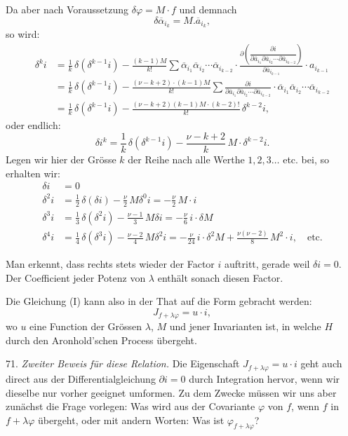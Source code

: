 \documentclass[11pt]{article}
\providecommand{\weberpage}[1]{}
\providecommand{\weq}[2]{\begin{equation}\tag{#1}#2\end{equation}}
\begin{document}
Da aber nach Voraussetzung $\delta\varphi = M\cdot f$ und demnach
\[
\delta\overline\alpha_{i_k} = M.\overline a_{i_k},
\]
so wird:
\[
\begin{aligned}
\delta^k i &= \frac{1}{k}\,\delta(\delta^{k-1}i) - \frac{(k-1)M}{k!}\sum \overline\alpha_{i_1}\overline\alpha_{i_2}\cdots\overline\alpha_{i_{k-2}}\cdot \frac{\partial\left(\dfrac{\partial i}{\partial\overline a_{i_1}\partial\overline a_{i_2}\cdots\partial\overline a_{i_{k-2}}}\right)}{\partial\overline a_{i_{k-1}}}\cdot a_{i_{k-1}}\\
&= \frac{1}{k}\,\delta(\delta^{k-1}i) - \frac{(\nu-k+2)\cdot(k-1)M}{k!}\sum \frac{\partial i}{\partial\overline a_{i_1}\partial\overline a_{i_2}\cdots\partial\overline a_{i_{k-2}}}\cdot \overline\alpha_{i_1}\overline\alpha_{i_2}\cdots\overline\alpha_{i_{k-2}}\\
&= \frac{1}{k}\,\delta(\delta^{k-1}i) - \frac{(\nu-k+2)(k-1)M\cdot(k-2)!}{k!}\,\delta^{k-2}i,
\end{aligned}
\]
oder endlich:
\weq{II}{\delta i^k = \frac{1}{k}\,\delta(\delta^{k-1}i) - \frac{\nu-k+2}{k}\,M\cdot\delta^{k-2}i.}
Legen wir hier der Grösse $k$ der Reihe nach alle Werthe $1, 2, 3\dots$ etc. bei, so erhalten wir:
\[
\begin{aligned}
\delta i &= 0\\
\delta^2 i &= \frac{1}{2}\,\delta(\delta i) - \frac{\nu}{2}\,M\delta^0 i = -\frac{\nu}{2}\,M\cdot i\\
\delta^3 i &= \frac{1}{3}\,\delta(\delta^2 i) - \frac{\nu-1}{3}\,M\delta i = -\frac{\nu}{6}\,i\cdot \delta M\\
\delta^4 i &= \frac{1}{4}\,\delta(\delta^3 i) - \frac{\nu-2}{4}\,M\delta^2 i = -\frac{\nu}{24}\,i\cdot \delta^2 M + \frac{\nu(\nu-2)}{8}\,M^2\cdot i, \quad \text{etc.}
\end{aligned}
\]

Man erkennt, dass rechts stets wieder der Factor $i$ auftritt, gerade weil $\delta i=0$. Der Coefficient jeder Potenz von $\lambda$ enthält sonach diesen Factor.


\weberpage{76}
Die Gleichung (I) kann also in der That auf die Form gebracht werden:
\[
J_{f+\lambda\varphi} = u\cdot i,
\]
wo $u$ eine Function der Grössen $\lambda$, $M$ und jener Invarianten ist, in welche $H$ durch den Aronhold'schen Process übergeht.

71. \textit{Zweiter Beweis für diese Relation.} Die Eigenschaft $J_{f+\lambda\varphi}=u\cdot i$ geht auch direct aus der Differentialgleichung $\partial i=0$ durch Integration hervor, wenn wir dieselbe nur vorher geeignet umformen. Zu dem Zwecke müssen wir uns aber zunächst die Frage vorlegen: Was wird aus der Covariante $\varphi$ von $f$, wenn $f$ in $f+\lambda\varphi$ übergeht, oder mit andern Worten: Was ist $\varphi_{f+\lambda\varphi}$?
\end{document}
